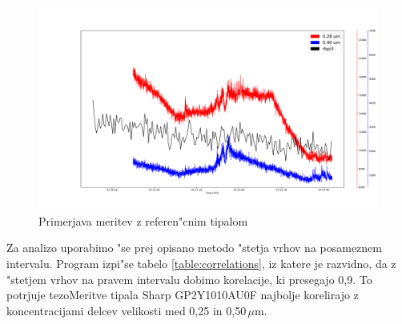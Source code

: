 \documentclass[11pt,a4paper]{article}
\begin{document}
\begin{figure}[H]
	\begin{center}
		\includegraphics[width=16cm]{comparison.pdf}
		\caption{Primerjava meritev z referen"cnim tipalom}
		\label{comparison}
	\end{center}
\end{figure}

Za analizo uporabimo "se prej opisano metodo "stetja vrhov na posameznem intervalu. Program izpi"se tabelo \ref{table:correlations}, iz katere je razvidno, da z "stetjem vrhov na pravem intervalu dobimo korelacije, ki presegajo 0,9. To potrjuje tezoMeritve tipala Sharp GP2Y1010AU0F najbolje korelirajo z koncentracijami delcev velikosti med 0,25 in 0,50\,$\mu$m. 
\end{document}
